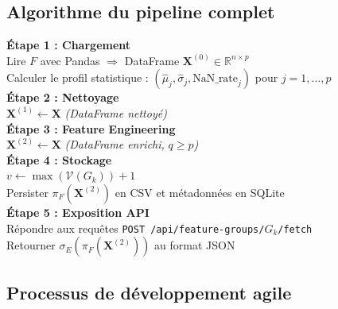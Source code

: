 \documentclass[12pt,a4paper]{article}
\begin{document}
\subsection{Algorithme du pipeline complet}

\begin{algorithm}[H]
\caption{Pipeline Feature Store --- Workflow complet}

\BlankLine
\textbf{Étape 1 : Chargement}\\
Lire $F$ avec Pandas $\Rightarrow$ DataFrame $\mathbf{X}^{(0)} \in \mathbb{R}^{n \times p}$\\
Calculer le profil statistique : $(\hat{\mu}_j, \hat{\sigma}_j, \text{NaN\_rate}_j)$ pour $j=1,\ldots,p$\\

\BlankLine
\textbf{Étape 2 : Nettoyage}\\
$\mathbf{X}^{(1)} \leftarrow \mathbf{X}$ \quad \textit{(DataFrame nettoyé)}\\

\BlankLine
\textbf{Étape 3 : Feature Engineering}\\
$\mathbf{X}^{(2)} \leftarrow \mathbf{X}$ \quad \textit{(DataFrame enrichi, } $q \geq p$\textit{)}\\

\BlankLine
\textbf{Étape 4 : Stockage}\\
$v \leftarrow \max(\mathcal{V}(G_k)) + 1$\\
Persister $\pi_F(\mathbf{X}^{(2)})$ en CSV et métadonnées en SQLite\\

\BlankLine
\textbf{Étape 5 : Exposition API}\\
Répondre aux requêtes \texttt{POST /api/feature-groups/$G_k$/fetch}\\
Retourner $\sigma_E(\pi_F(\mathbf{X}^{(2)}))$ au format JSON
\end{algorithm}

\subsection{Processus de développement agile}
\end{document}
